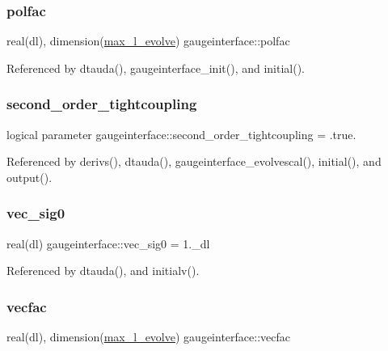\subsubsection{\texorpdfstring{polfac}{polfac}}
{\footnotesize\ttfamily real(dl), dimension(\mbox{\hyperlink{namespacegaugeinterface_a965f8caba9ba282e718281110e274b04}{max\+\_\+l\+\_\+evolve}}) gaugeinterface\+::polfac}



Referenced by dtauda(), gaugeinterface\+\_\+init(), and initial().

\mbox{\label{namespacegaugeinterface_af060fa6622bea0f389dc0965bee8d67f}} 
\subsubsection{\texorpdfstring{second\+\_\+order\+\_\+tightcoupling}{second\_order\_tightcoupling}}
{\footnotesize\ttfamily logical parameter gaugeinterface\+::second\+\_\+order\+\_\+tightcoupling = .true.}



Referenced by derivs(), dtauda(), gaugeinterface\+\_\+evolvescal(), initial(), and output().

\mbox{\label{namespacegaugeinterface_ae547cea1b332095dd0c9b5a6c24466ae}} 
\subsubsection{\texorpdfstring{vec\+\_\+sig0}{vec\_sig0}}
{\footnotesize\ttfamily real(dl) gaugeinterface\+::vec\+\_\+sig0 = 1.\+\_\+dl}



Referenced by dtauda(), and initialv().

\mbox{\label{namespacegaugeinterface_adc490d2cf60b4b4224f782920c48141a}} 
\subsubsection{\texorpdfstring{vecfac}{vecfac}}
{\footnotesize\ttfamily real(dl), dimension(\mbox{\hyperlink{namespacegaugeinterface_a965f8caba9ba282e718281110e274b04}{max\+\_\+l\+\_\+evolve}}) gaugeinterface\+::vecfac}



